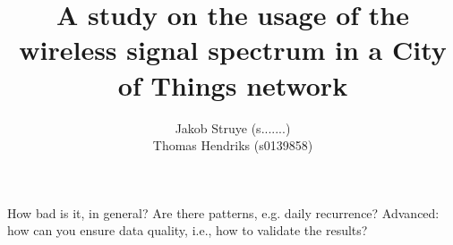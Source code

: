 \documentclass[a4paper, 11pt]{article}
\begin{document}
%
\title{A study on the usage of the wireless signal spectrum in a City of Things network}


\author{
	Jakob Struye (s.......)\\ 
    Thomas Hendriks (s0139858)\\
}

How bad is it, in general? 
Are there patterns, e.g. daily recurrence? 
Advanced: how can you ensure data quality, i.e., how to validate the results? 

\maketitle


\tableofcontents
\clearpage
\end{document}
